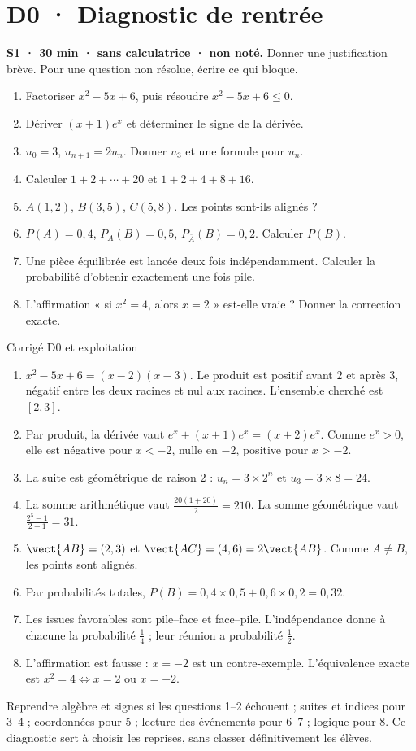 \clearpage\chapter*{D0 · Diagnostic de rentrée}
\textbf{S1 · 30 min · sans calculatrice · non noté.} Donner une justification brève. Pour une question non résolue, écrire ce qui bloque.
\begin{enumerate}
\item Factoriser $x^2-5x+6$, puis résoudre $x^2-5x+6\le0$.
\item Dériver $(x+1)e^x$ et déterminer le signe de la dérivée.
\item $u_0=3$, $u_{n+1}=2u_n$. Donner $u_3$ et une formule pour $u_n$.
\item Calculer $1+2+\cdots+20$ et $1+2+4+8+16$.
\item $A(1,2)$, $B(3,5)$, $C(5,8)$. Les points sont-ils alignés ?
\item $P(A)=0{,}4$, $P_A(B)=0{,}5$, $P_{\overline A}(B)=0{,}2$. Calculer $P(B)$.
\item Une pièce équilibrée est lancée deux fois indépendamment. Calculer la probabilité d'obtenir exactement une fois pile.
\item L'affirmation « si $x^2=4$, alors $x=2$ » est-elle vraie ? Donner la correction exacte.
\end{enumerate}
\ifprof\begin{profbox}{Corrigé D0 et exploitation}
\begin{enumerate}
\item $x^2-5x+6=(x-2)(x-3)$. Le produit est positif avant $2$ et après $3$, négatif entre les deux racines et nul aux racines. L'ensemble cherché est $[2,3]$.
\item Par produit, la dérivée vaut $e^x+(x+1)e^x=(x+2)e^x$. Comme $e^x>0$, elle est négative pour $x<-2$, nulle en $-2$, positive pour $x>-2$.
\item La suite est géométrique de raison $2$ : $u_n=3\times2^n$ et $u_3=3\times8=24$.
\item La somme arithmétique vaut $\frac{20(1+20)}{2}=210$. La somme géométrique vaut $\frac{2^5-1}{2-1}=31$.
\item $\vect{AB}=(2,3)$ et $\vect{AC}=(4,6)=2\vect{AB}$. Comme $A\ne B$, les points sont alignés.
\item Par probabilités totales, $P(B)=0{,}4\times0{,}5+0{,}6\times0{,}2=0{,}32$.
\item Les issues favorables sont pile--face et face--pile. L'indépendance donne à chacune la probabilité $\frac{1}{4}$ ; leur réunion a probabilité $\frac{1}{2}$.
\item L'affirmation est fausse : $x=-2$ est un contre-exemple. L'équivalence exacte est $x^2=4\Longleftrightarrow x=2\text{ ou }x=-2$.
\end{enumerate}
Reprendre algèbre et signes si les questions 1--2 échouent ; suites et indices pour 3--4 ; coordonnées pour 5 ; lecture des événements pour 6--7 ; logique pour 8. Ce diagnostic sert à choisir les reprises, sans classer définitivement les élèves.
\end{profbox}\fi
\mainmatter



